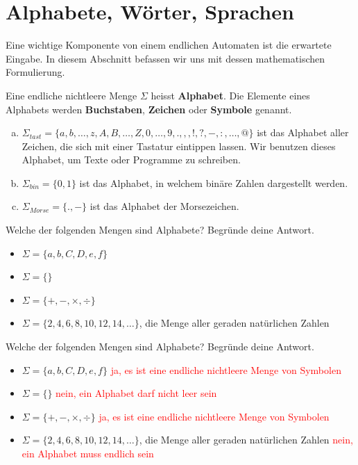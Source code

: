 \documentclass{article}
\begin{document}
\section{Alphabete, Wörter, Sprachen}
Eine wichtige Komponente von einem endlichen Automaten ist die erwartete Eingabe. In diesem Abschnitt befassen wir uns mit dessen mathematischen Formulierung.

\begin{definition}
Eine endliche nichtleere Menge \(\Sigma\) heisst \textbf{Alphabet}. Die Elemente eines Alphabets werden \textbf{Buchstaben}, \textbf{Zeichen} oder \textbf{Symbole} genannt.
\end{definition}

\begin{example}
\begin{enumerate}[(a)]
    \item \(\Sigma_{tast} = \{a, b, \dots, z, A, B, \dots, Z, 0, \dots, 9, ., ,, !, ?, -, :, \dots, @\}\) ist das Alphabet aller Zeichen, die sich mit einer Tastatur eintippen lassen. Wir benutzen dieses Alphabet, um Texte oder Programme zu schreiben.
    \item \(\Sigma_{bin} = \{0, 1\}\) ist das Alphabet, in welchem binäre Zahlen dargestellt werden.
    \item \(\Sigma_{Morse} = \{.,-\}\) ist das Alphabet der Morsezeichen.
\end{enumerate}
\end{example}

\begin{exercise}
Welche der folgenden Mengen sind Alphabete? Begründe deine Antwort.
\begin{itemize}[label=$\square$]
    \item \(\Sigma = \{a, b, C, D, e, f\}\)
    \item \(\Sigma = \{\}\)
    \item \(\Sigma = \{+, -, \times, \div\}\)
    \item \(\Sigma = \{2, 4, 6, 8, 10, 12, 14, \dots\}\), die Menge aller geraden natürlichen Zahlen
\end{itemize}
\end{exercise}

\begin{solution}
Welche der folgenden Mengen sind Alphabete? Begründe deine Antwort.
\begin{itemize}[label=$\square$]
    \item \(\Sigma = \{a, b, C, D, e, f\}\) \hfill \textcolor{red}{ja, es ist eine endliche nichtleere Menge von Symbolen}
    \item \(\Sigma = \{\}\) \hfill \textcolor{red}{nein, ein Alphabet darf nicht leer sein}
    \item \(\Sigma = \{+, -, \times, \div\}\) \hfill \textcolor{red}{ja, es ist eine endliche nichtleere Menge von Symbolen}
    \item \(\Sigma = \{2, 4, 6, 8, 10, 12, 14, \dots\}\), die Menge aller geraden natürlichen Zahlen \hfill \textcolor{red}{nein, ein Alphabet muss endlich sein}
\end{itemize}
\end{solution}
\end{document}
